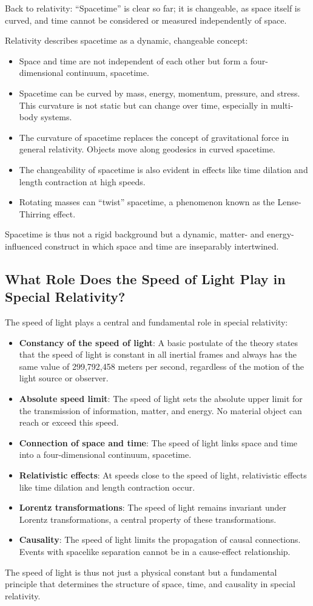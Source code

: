 \documentclass[a4paper,12pt]{article}
\begin{document}
	Back to relativity: ``Spacetime'' is clear so far; it is changeable, as space itself is curved, and time cannot be considered or measured independently of space.
	
	Relativity describes spacetime as a dynamic, changeable concept:
	\begin{itemize}
		\item Space and time are not independent of each other but form a four-dimensional continuum, spacetime.
		\item Spacetime can be curved by mass, energy, momentum, pressure, and stress. This curvature is not static but can change over time, especially in multi-body systems.
		\item The curvature of spacetime replaces the concept of gravitational force in general relativity. Objects move along geodesics in curved spacetime.
		\item The changeability of spacetime is also evident in effects like time dilation and length contraction at high speeds.
		\item Rotating masses can ``twist'' spacetime, a phenomenon known as the Lense-Thirring effect.
	\end{itemize}
	Spacetime is thus not a rigid background but a dynamic, matter- and energy-influenced construct in which space and time are inseparably intertwined.
	
	\subsection{What Role Does the Speed of Light Play in Special Relativity?}
	The speed of light plays a central and fundamental role in special relativity:
	\begin{itemize}
		\item \textbf{Constancy of the speed of light}: A basic postulate of the theory states that the speed of light is constant in all inertial frames and always has the same value of 299,792,458 meters per second, regardless of the motion of the light source or observer.
		\item \textbf{Absolute speed limit}: The speed of light sets the absolute upper limit for the transmission of information, matter, and energy. No material object can reach or exceed this speed.
		\item \textbf{Connection of space and time}: The speed of light links space and time into a four-dimensional continuum, spacetime.
		\item \textbf{Relativistic effects}: At speeds close to the speed of light, relativistic effects like time dilation and length contraction occur.
		\item \textbf{Lorentz transformations}: The speed of light remains invariant under Lorentz transformations, a central property of these transformations.
		\item \textbf{Causality}: The speed of light limits the propagation of causal connections. Events with spacelike separation cannot be in a cause-effect relationship.
	\end{itemize}
	The speed of light is thus not just a physical constant but a fundamental principle that determines the structure of space, time, and causality in special relativity.
	
\end{document}

